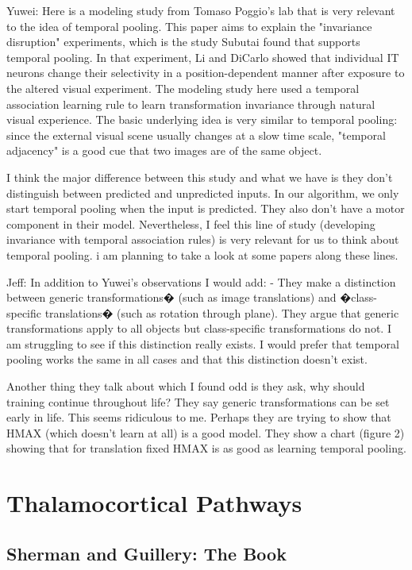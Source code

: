 \documentclass{article} %
\begin{document}
Yuwei: Here \cite{Isik2012} is a modeling study from Tomaso Poggio's lab that
 is very
relevant to the idea of temporal pooling. This paper aims to explain the
"invariance disruption" experiments, which is the study Subutai found that
supports temporal pooling. In that experiment, Li and DiCarlo
\cite{Li2008} showed that
individual IT neurons change their selectivity in a position-dependent manner
after exposure to the altered visual experiment. The modeling study here used a
temporal association learning rule to learn transformation invariance through
natural visual experience. The basic underlying idea is very similar to temporal
pooling: since the external visual scene usually changes at a slow time scale,
"temporal adjacency" is a good cue that two images are of the same object.

I think the major difference between this study and what we have is they don't
distinguish between predicted and unpredicted inputs. In our algorithm, we only
start temporal pooling when the input is predicted. They also don't have a motor
component in their model. Nevertheless, I feel this line of study (developing
invariance with temporal association rules) is very relevant for us to think
about temporal pooling. i am planning to take a look at some papers along these
lines.

Jeff:  In addition to Yuwei's observations I would add:  - They make a
distinction between generic transformations� (such as image translations) and
�class-specific translations� (such as rotation through plane).  They argue that
generic transformations apply to all objects but class-specific transformations
do not.  I am struggling to see if this distinction really exists.  I would
prefer that temporal pooling works the same in all cases and that this
distinction doesn't exist.


Another thing they talk about which I found odd is they ask, why should
training continue throughout life?  They say generic transformations can be set
early in life.  This seems ridiculous to me.  Perhaps they are trying to show
that HMAX (which doesn't learn at all) is a good model.  They show a chart
(figure 2) showing that for translation fixed HMAX is as good as learning
temporal pooling.


\section{Thalamocortical Pathways}

\subsection{Sherman and Guillery: The Book}
\end{document}
